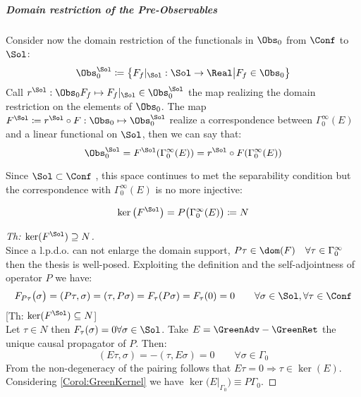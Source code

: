 \documentclass[Main]{subfiles}
\begin{document}
			\subparagraph{Domain restriction of the Pre-Observables} 
			  		
				Consider now the domain restriction of the functionals in $\Obs_0$ from $\Conf$ to $\Sol$:
   					\begin{displaymath}
   						\Obs_0^\Sol \coloneqq \big\{F_f\vert_\Sol : \Sol \rightarrow \Real \big \vert F_f \in \Obs_0 \big\}
   					\end{displaymath}
				Call $r^\Sol : \Obs_0 F_f \mapsto F_f \vert_\Sol \in \Obs_0^\Sol$ the map realizing the domain restriction on the elements of $\Obs_0$.
				The map $F^\Sol \coloneqq r^\Sol \circ F : \Obs_0 \mapsto \Obs_0^\Sol $ realize a correspondence between $\Gamma_0^\infty(E)$ and a linear functional on $\Sol$, then we can say that:
				\begin{displaymath}
					\Obs_0^\Sol = F^\Sol ( \Gamma_0^\infty(E)) = r^\Sol \circ F (\Gamma_0^\infty(E)) 
				\end{displaymath}				   					
   					
   				Since $\Sol \subset \Conf$ , this space continues to met the separability condition but the correspondence with  $\Gamma_0^\infty(E)$ is no more injective:
					\begin{proposition}\label{Teo:NspaceDefinition}
						\begin{displaymath}
							\ker \big( F^\Sol \big) = P \big( \Gamma_0^\infty (E) \big)	\coloneqq N	
						\end{displaymath}
					\end{proposition}
					\begin{proof}
					[Th: $\ker(F^\Sol) \supseteq N$]\\
					Since a l.p.d.o. can not enlarge the domain support, $ P \tau \in \dom(F) \quad \forall \tau \in \Gamma_0^\infty$ then the thesis is well-posed.
					Exploiting the definition and the self-adjointness of operator $P$ we have:
					\begin{displaymath}
						F_{P\tau} \big( \sigma \big) = ( P\tau, \sigma) = (\tau, P\sigma) = F_\tau (P\sigma)= F_\tau(0) = 0 \qquad \forall \sigma \in \Sol, \forall \tau \in \Conf
					\end{displaymath}
					[Th: $\ker(F^\Sol) \subseteq N$]\\			
					Let $	\tau \in N$ then $F_\tau (\sigma) =0 \forall \sigma \in \Sol$.
					Take $E= \GreenAdv- \GreenRet$	 the unique causal propagator of $P$.
					Then:
					\begin{displaymath}
						(E \tau , \sigma) = - (\tau , E \sigma) = 0 \qquad \forall \sigma \in \Gamma_0
					\end{displaymath}								
					From the non-degeneracy of the pairing follows that $E\tau = 0 \Rightarrow  \tau \in \ker(E)$.
					Considering \ref{Corol:GreenKernel} we have $ \ker \big(E\big\vert_{\Gamma_0} \big) \equiv P \Gamma_0$.
					\end{proof}
   			
\end{document}
